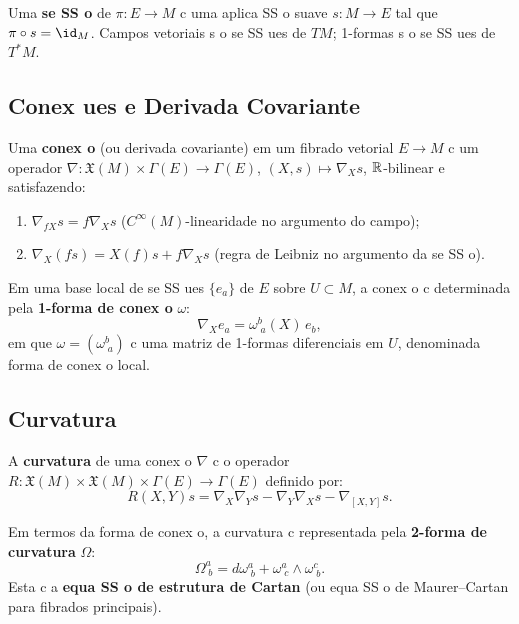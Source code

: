 Uma \textbf{se SS o} de $\pi:E\to M$ c uma aplica SS o suave $s:M\to E$ tal que $\pi\circ s = \id_M$. Campos vetoriais s o se SS ues de $TM$; 1-formas s o se SS ues de $T^*M$.

\subsection{Conex ues e Derivada Covariante}

\begin{defi}
Uma \textbf{conex o} (ou derivada covariante) em um fibrado vetorial $E\to M$ c um operador $\nabla:\mathfrak{X}(M)\times\Gamma(E)\to\Gamma(E)$, $(X,s)\mapsto\nabla_X s$, $\mathbb{R}$-bilinear e satisfazendo:
\begin{enumerate}
 \item $\nabla_{fX}s = f\nabla_X s$ ($C^\infty(M)$-linearidade no argumento do campo);
 \item $\nabla_X(fs) = X(f)s + f\nabla_X s$ (regra de Leibniz no argumento da se SS o).
\end{enumerate}
\end{defi}

Em uma base local de se SS ues $\{e_a\}$ de $E$ sobre $U\subset M$, a conex o c determinada pela \textbf{1-forma de conex o} $\omega$:
\begin{equation}
 \nabla_X e_a = \omega^b_{\;a}(X)\,e_b,
\end{equation}
em que $\omega = (\omega^b_{\;a})$ c uma matriz de 1-formas diferenciais em $U$, denominada forma de conex o local.

\subsection{Curvatura}

\begin{defi}
A \textbf{curvatura} de uma conex o $\nabla$ c o operador $R:\mathfrak{X}(M)\times\mathfrak{X}(M)\times\Gamma(E)\to\Gamma(E)$ definido por:
\begin{equation}
 R(X,Y)s = \nabla_X\nabla_Y s - \nabla_Y\nabla_X s - \nabla_{[X,Y]}s.
\end{equation}
\end{defi}

Em termos da forma de conex o, a curvatura c representada pela \textbf{2-forma de curvatura} $\Omega$:
\begin{equation}
 \Omega^a_{\;b} = d\omega^a_{\;b} + \omega^a_{\;c}\wedge\omega^c_{\;b}.
\end{equation}
Esta c a \textbf{equa SS o de estrutura de Cartan} (ou equa SS o de Maurer--Cartan para fibrados principais).

